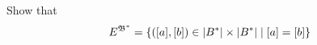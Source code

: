 \begin{problem}
\begin{enumalph}
\begin{Answer}
      \end{Answer}

    \item Show that 
      \[ E^{\mathfrak{B}^*} = \left\{([a], [b]) \in \lvert B^*\rvert \times \lvert B^*\rvert
          \mid [a] = [b]\right\} \]
      \begin{Answer}

      \end{Answer}
  \end{enumalph}
\end{problem}
